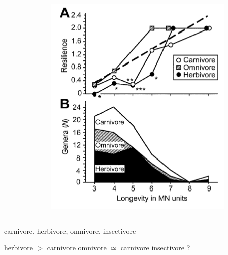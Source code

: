 \documentclass{beamer}
\begin{document}
\begin{frame}
\begin{columns}
\begin{column}{0.5\textwidth}
    \end{column}
    \begin{column}{0.5\textwidth}
      \includegraphics[height=0.5\textheight,width=\textwidth,keepaspectratio=true]{figure/jernvall}
    \end{column}
  \end{columns}

  \begin{center}
    carnivore, herbivore, omnivore, insectivore

    \vspace{0.2cm}

    herbivore \(>\) carnivore \hspace{0.3cm} omnivore \(\simeq\) carnivore \hspace{0.5cm} insectivore ?

  \end{center}
\end{frame}
\end{document}
